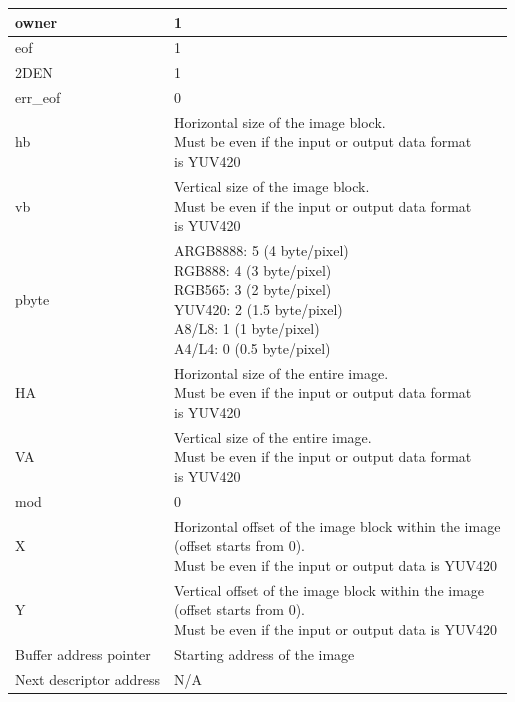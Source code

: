 \documentclass[main\_\_EN.tex]{subfiles}
\begin{document}
\begin{longtable}[c]{ |p{2.5cm}|p{8cm}| }
        owner & 1 \\\hline
        eof & 1 \\\hline
        2DEN & 1 \\\hline
        err\_eof & 0 \\\hline
        hb & \makecell[l]{Horizontal size of the image block.\\ Must be even if the input or output data format \\is YUV420} \\\hline
        vb & \makecell[l]{Vertical size of the image block.\\ Must be even if the input or output data format \\is YUV420} \\\hline
        pbyte & \makecell[l]{ARGB8888: 5 (4 byte/pixel)\\RGB888: 4 (3 byte/pixel)\\RGB565: 3 (2 byte/pixel)\\YUV420: 2 (1.5 byte/pixel)\\A8/L8: 1 (1 byte/pixel)\\A4/L4: 0 (0.5 byte/pixel)} \\\hline
        HA & \makecell[l]{Horizontal size of the entire image.\\ Must be even if the input or output data format \\is YUV420} \\\hline
        VA & \makecell[l]{Vertical size of the entire image.\\ Must be even if the input or output data format \\is YUV420} \\\hline
        mod & 0 \\\hline
        X & \makecell[l]{Horizontal offset of the image block within the image \\(offset starts from 0).\\ Must be even if the input or output data is YUV420} \\\hline
        Y & \makecell[l]{Vertical offset of the image block within the image \\(offset starts from 0). \\Must be even if the input or output data is YUV420} \\\hline
        Buffer address pointer & Starting address of the image \\\hline
        Next descriptor address & N/A \\\hline

\end{longtable}
\end{document}
